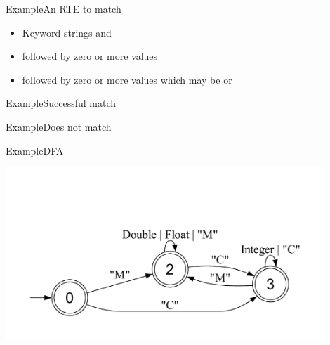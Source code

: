 \newsavebox\exampleAbbox
\begin{lrbox}{\exampleAbbox}
  \begin{minipage}{12cm}
    
  \end{minipage}
\end{lrbox}

\newsavebox\exampleAcbox
\begin{lrbox}{\exampleAcbox}
  \begin{minipage}{12cm}
    
  \end{minipage}
\end{lrbox}

\newsavebox\exampleAdbox
\begin{lrbox}{\exampleAdbox}
  \begin{minipage}{12cm}
    
  \end{minipage}
\end{lrbox}


\begin{frame}{Example}{An RTE to match}
  \usebox\exampleAbox

  \begin{itemize}
  \item Keyword strings  and 
  \item {} followed by zero or more  values
  \item {} followed by zero or more values which may be  or 
  \end{itemize}
\end{frame}

\begin{frame}{Example}{Successful match}
  \usebox\exampleAbbox
\end{frame}

\begin{frame}{Example}{Does not match}
  \usebox\exampleAcbox
\end{frame}

\begin{frame}{Example}{DFA}
  \usebox\exampleAdbox
  
  \includegraphics[width=0.9\textwidth]{example2.pdf}
\end{frame}

